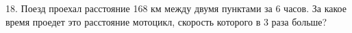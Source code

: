 18. Поезд проехал расстояние 168 км между двумя пунктами за 6 часов. За какое время проедет это расстояние мотоцикл, скорость которого в 3 раза больше?\\
